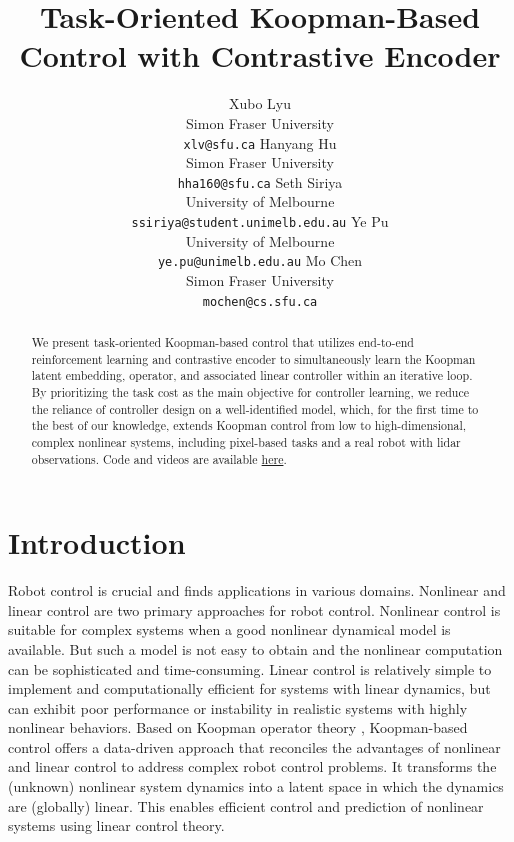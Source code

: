 \documentclass{article}
\title{Task-Oriented Koopman-Based Control with Contrastive Encoder}
\author{
  Xubo Lyu\\
  Simon Fraser University \\
  \texttt{xlv@sfu.ca}
  \And
  Hanyang Hu \\
  Simon Fraser University \\
  \texttt{hha160@sfu.ca}
  \AND
  Seth Siriya \\
  University of Melbourne \\
  \texttt{ssiriya@student.unimelb.edu.au}
  \And
  Ye Pu \\
  University of Melbourne \\
  \texttt{ye.pu@unimelb.edu.au}
  \And
  Mo Chen \\
  Simon Fraser University \\
  \texttt{mochen@cs.sfu.ca}
}
\begin{document}
\maketitle

\begin{abstract}
    We present task-oriented Koopman-based control that utilizes end-to-end reinforcement learning and contrastive encoder to simultaneously learn the Koopman latent embedding, operator, and associated linear controller within an iterative loop. By prioritizing the task cost as the main objective for controller learning, we reduce the reliance of controller design on a well-identified model, which, for the first time to the best of our knowledge, extends Koopman control from low to high-dimensional, complex nonlinear systems, including pixel-based tasks and a real robot with lidar observations.
    Code and videos are available \href{https://sites.google.com/view/kpmlilatsupp/}{here}.
\end{abstract}



\section{Introduction}
\label{sec:intro}
Robot control is crucial and finds applications in various domains. Nonlinear and linear control are two primary approaches for robot control. Nonlinear control \cite{slotine1991applied, lantos2010nonlinear, dawson2022safe} is suitable for complex systems when a good nonlinear dynamical model is available. But such a model is not easy to obtain and the nonlinear computation can be sophisticated and time-consuming. Linear control \cite{trentelman2012control, li2019online, rinaldi2013linear} is relatively simple to implement and computationally efficient for systems with linear dynamics, but can exhibit poor performance or instability in realistic systems with highly nonlinear behaviors. Based on Koopman operator theory \cite{koopman1931hamiltonian}, Koopman-based control \cite{jackson2023data, proctor2016dynamic, tu2013dynamic, han2020deep} offers a data-driven approach that reconciles the advantages of nonlinear and linear control to address complex robot control problems. It transforms the (unknown) nonlinear system dynamics into a latent space in which the dynamics are (globally) linear. This enables efficient control and prediction of nonlinear systems using linear control theory.
\end{document}

